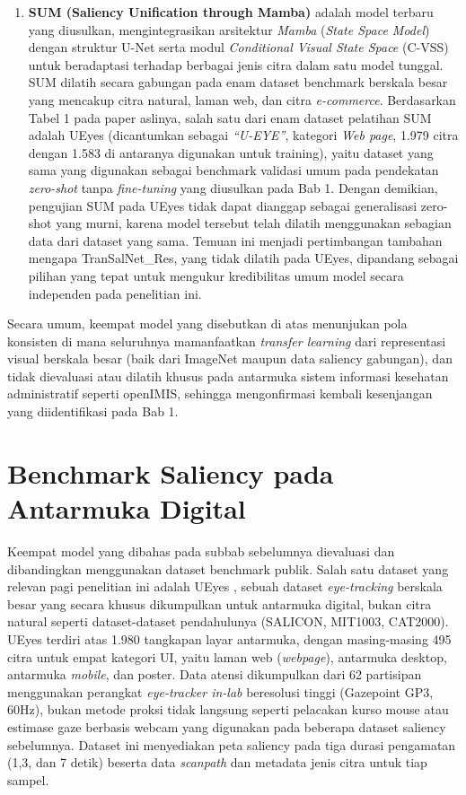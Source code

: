 \begin{enumerate}
    \item \textbf{SUM (Saliency Unification through Mamba)} \citep{hosseini2025sum} adalah model terbaru yang diusulkan, mengintegrasikan arsitektur \textit{Mamba} (\textit{State Space Model}) dengan struktur U-Net serta modul \textit{Conditional Visual State Space} (C-VSS) untuk beradaptasi terhadap berbagai jenis citra dalam satu model tunggal. SUM dilatih secara gabungan pada enam dataset benchmark berskala besar yang mencakup citra natural, laman web, dan citra \textit{e-commerce}. Berdasarkan Tabel 1 pada paper aslinya, salah satu dari enam dataset pelatihan SUM adalah UEyes (dicantumkan sebagai \textit{``U-EYE''}, kategori \textit{Web page}, 1.979 citra dengan 1.583 di antaranya digunakan untuk training), yaitu dataset yang sama yang digunakan sebagai benchmark validasi umum pada pendekatan \textit{zero-shot} tanpa \textit{fine-tuning} yang diusulkan pada Bab 1. Dengan demikian, pengujian SUM pada UEyes tidak dapat dianggap sebagai generalisasi zero-shot yang murni, karena model tersebut telah dilatih menggunakan sebagian data dari dataset yang sama. Temuan ini menjadi pertimbangan tambahan mengapa TranSalNet\_Res, yang tidak dilatih pada UEyes, dipandang sebagai pilihan yang tepat untuk mengukur kredibilitas umum model secara independen pada penelitian ini.
\end{enumerate} 

Secara umum, keempat model yang disebutkan di atas menunjukan pola konsisten di mana seluruhnya mamanfaatkan \textit{transfer learning} dari representasi visual berskala besar (baik dari ImageNet maupun data saliency gabungan), dan tidak dievaluasi atau dilatih khusus pada antarmuka sistem informasi kesehatan administratif seperti openIMIS, sehingga mengonfirmasi kembali kesenjangan yang diidentifikasi pada Bab 1.


\section{Benchmark Saliency pada Antarmuka Digital}

Keempat model yang dibahas pada subbab sebelumnya dievaluasi dan dibandingkan menggunakan dataset benchmark publik. Salah satu dataset yang relevan pagi penelitian ini adalah UEyes \citep{jiang2023ueyes}, sebuah dataset \textit{eye-tracking} berskala besar yang secara khusus dikumpulkan untuk antarmuka digital, bukan citra natural seperti dataset-dataset pendahulunya (SALICON, MIT1003, CAT2000). UEyes terdiri atas 1.980 tangkapan layar antarmuka, dengan masing-masing 495 citra untuk empat kategori UI, yaitu laman web (\textit{webpage}), antarmuka desktop, antarmuka \textit{mobile}, dan poster. Data atensi dikumpulkan dari 62 partisipan menggunakan perangkat \textit{eye-tracker in-lab} beresolusi tinggi (Gazepoint GP3, 60Hz), bukan metode proksi tidak langsung seperti pelacakan kurso mouse atau estimase gaze berbasis webcam yang digunakan pada beberapa dataset saliency sebelumnya. Dataset ini menyediakan peta saliency pada tiga durasi pengamatan (1,3, dan 7 detik) beserta data \textit{scanpath} dan metadata jenis citra untuk tiap sampel.

